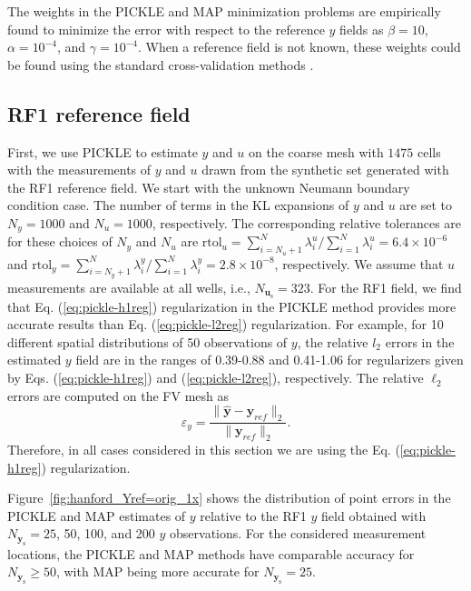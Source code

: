 \documentclass{agujournal2019}
\begin{document}
The weights in the PICKLE and MAP minimization problems are empirically found to minimize the error with respect to the reference $y$ fields as $\beta=10$, $\alpha=10^{-4}$, and $\gamma=10^{-4}$. When a reference field is not known, these weights could be found using the standard cross-validation methods \citep{picard1984cross}.      


\subsection{RF1 reference field}\label{sec:RF1_field}

First, we use PICKLE to estimate $y$ and $u$ on the coarse mesh with $1475$ cells with the measurements of $y$ and $u$ drawn from the synthetic set generated with the RF1 reference field.
We start with the unknown Neumann boundary condition case.
The number of terms in the KL expansions of $y$ and $u$ are set to $N_y=1000$ and $N_u=1000$, respectively.
The corresponding relative tolerances are for these choices of $N_y$ and $N_u$ are 
$\text{rtol}_u =  \sum^{N}_{i = N_u + 1} \lambda_i^u / \sum^{N}_{i = 1} \lambda_i^u = 6.4 \times 10^{-6}$
and
$\text{rtol}_y =  \sum^{N}_{i = N_y + 1} \lambda_i^y / \sum^{N}_{i = 1} \lambda_i^y = 2.8 \times 10^{-8}$, respectively.
We assume that $u$ measurements are available at all wells, i.e., $N_{\mathbf{u}_\mathrm{s}}=323$. For the RF1 field, we find that Eq. (\ref{eq:pickle-h1reg}) regularization in the PICKLE method provides more accurate results than Eq. (\ref{eq:pickle-l2reg}) regularization. 
For example, for 10 different spatial distributions of 50 observations of $y$, the relative $l_2$ errors in the estimated $y$ field are in the ranges of 0.39-0.88 and 0.41-1.06 for regularizers given by Eqs. (\ref{eq:pickle-h1reg}) and (\ref{eq:pickle-l2reg}), respectively.  
The relative $\ell_2$ errors are  computed on the FV mesh as
\begin{equation*}
    \varepsilon_y = \frac{ \|\hat{\mathbf{y}} - \mathbf{y}_{ref}\|_2 }{ \|\mathbf{y}_{ref}\|_2 }.
\end{equation*}
Therefore, in all cases considered in this section we are using the Eq. (\ref{eq:pickle-h1reg}) regularization.  

Figure~\ref{fig:hanford_Yref=orig_1x} shows the distribution of point errors in the PICKLE and MAP estimates of $y$ relative to the RF1 $y$ field obtained with $N_{\mathbf{y}_\mathrm{s}}=25$, 50, 100, and 200  $y$ observations. 
For the considered measurement locations, the PICKLE and MAP methods have comparable accuracy for $N_{\mathbf{y}_\mathrm{s}}\ge 50$, with MAP being more accurate for $N_{\mathbf{y}_\mathrm{s}}=25$.
\end{document}
